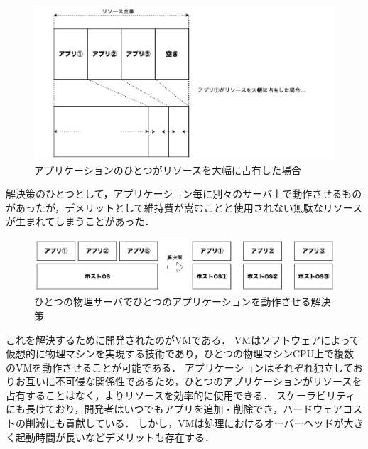 \begin{figure}[htbp]
\begin{center}
    \includegraphics[width=\textwidth]{./figures/resource-on-physical-server.jpg}
    \caption{アプリケーションのひとつがリソースを大幅に占有した場合}
\end{center}
\end{figure}

解決策のひとつとして，アプリケーション毎に別々のサーバ上で動作させるものがあったが，デメリットとして維持費が嵩むことと使用されない無駄なリソースが生まれてしまうことがあった．

\begin{figure}[htbp]
\begin{center}
    \includegraphics[width=\textwidth]{./figures/only-on-physical-server.jpg}
    \caption{ひとつの物理サーバでひとつのアプリケーションを動作させる解決策}
\end{center}
\end{figure}

これを解決するために開発されたのがVMである．
VMはソフトウェアによって仮想的に物理マシンを実現する技術であり，ひとつの物理マシンCPU上で複数のVMを動作させることが可能である．
アプリケーションはそれぞれ独立しておりお互いに不可侵な関係性であるため，ひとつのアプリケーションがリソースを占有することはなく，よりリソースを効率的に使用できる．
スケーラビリティにも長けており，開発者はいつでもアプリを追加・削除でき，ハードウェアコストの削減にも貢献している．
しかし，VMは処理におけるオーバーヘッドが大きく起動時間が長いなどデメリットも存在する．

